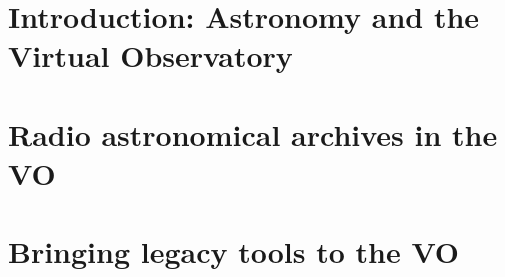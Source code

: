 \documentclass[11pt,a4paper,openright]{memoir}
\begin{document}
	
	
	

	\frontmatter
	
% 
 	\setlength{\parskip}{1\lineskip plus 1\lineskip minus 1\lineskip} 
 	

	
	
	\mainmatter %
	
	\part{Introduction: Astronomy and the Virtual Observatory}
	\label{prt:intro_vo}
	
	
	
	
	
	\part[Radio astronomical archives in the VO]
	{Radio astronomical archives in the VO}
	\label{partRadioDataModelling}
	
	
	
	
	
	
	
	
	
	
	\part{Bringing legacy tools to the VO}
	\label{prt:legacyTools}
	
	
	
	
	
\end{document}
